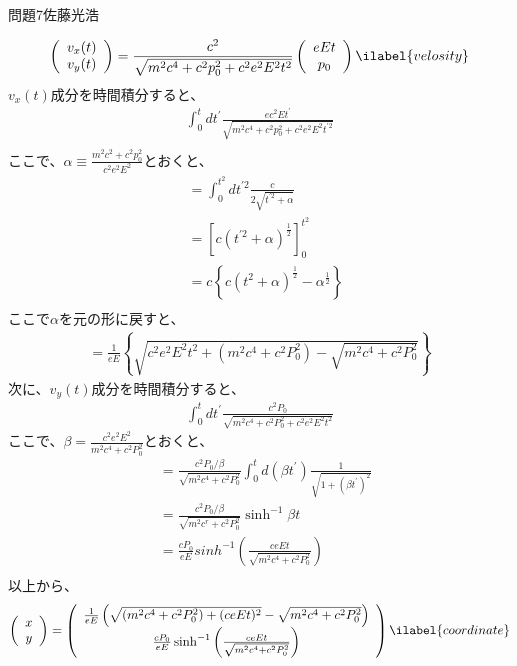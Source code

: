\documentclass[fleqn]{jbook}
\begin{document}
\begin{answer}{問題7}{佐藤光浩}
\begin{enumerate}
\begin{eqnarray}
 \left(\begin{array}{c} 
 v_x(t) \\ v_y(t) \end{array} \right)
 = \frac{c^2}{\sqrt{m^2c^4 + c^2p_0^2 + c^2e^2E^2t^2}}
 \left(\begin{array}{c}
 eEt \\ p_0 \end{array} \right) \ilabel{velosity}
\end{eqnarray}
$v_x(t)$成分を時間積分すると、
\begin{eqnarray*}
 \int^{t}_0 dt^{\prime}
 \frac{ec^2Et^{\prime}}{\sqrt{m^2c^4+c^2p_0^2+c^2e^2E^2t^{\prime 2}}}\\
 \end{eqnarray*}
ここで、$ \alpha \equiv \frac{m^2c^2 +c^2p_0^2}{c^2e^2E^2}$とおくと、
\begin{eqnarray*}
 &= \int^{t^2}_{0}dt^{\prime 2}\frac{c}{2\sqrt{t^{\prime 2} + \alpha}}\\
 &= \left[c(t^{\prime 2} +\alpha)^{\frac{1}{2}}\right]^{t^2}_0\\
 &= c \left\{ c(t^{2} +\alpha)^{\frac{1}{2}} -
 \alpha^{\frac{1}{2}} \right\} \\
\end{eqnarray*}
ここで$\alpha$を元の形に戻すと、
\begin{eqnarray*}
 = \frac{1}{eE} \left\{
 \sqrt{c^2e^2E^2t^2+(m^2c^4+c^2P_0^2)-\sqrt{m^2c^4+c^2P_0^2}}\right\}
\end{eqnarray*}
次に、$v_y(t)$成分を時間積分すると、
\begin{eqnarray*}
 \int^{t}_0 dt^{\prime}
 \frac{c^2P_0}{\sqrt{m^2c^4+c^2P_0^2+c^2e^2E^2t^2}}
\end{eqnarray*}
ここで、$ \beta = \frac{c^2e^2E^2}{m^2c^4+c^2P_0^2}$とおくと、
\begin{eqnarray*}
  &= \frac{c^2P_0/\beta}{\sqrt{m^2c^4+c^2P_0^2}} \int^t_0
  d(\beta t^{\prime}) \frac{1}{\sqrt{1+(\beta t^{\prime})^2}} \\
  &= \frac{c^2P_0/\beta}{\sqrt{m^2c^r+c^2P_0^2}} \sinh^{-1} \beta t \\
  &= \frac{cP_0}{eE} sinh^{-1}
  \left(\frac{ceEt}{\sqrt{m^2c^4+c^2P_0^2}} \right) \\
\end{eqnarray*}
以上から、
\begin{eqnarray}
 \left(\begin{array}{c} x\\ y\end{array} \right) = \left(\begin{array}{c}
 \frac{1}{eE}
 \left(\sqrt{(m^2c^4+c^2P_0^2)+(ceEt)^2}-\sqrt{m^2c^4+c^2P_0^2} \right) \\
  \frac{cP_0}{eE}
 \sinh^{-1}\left(\frac{ceEt}{\sqrt{m^2c^4+c^2P_0^2}}\right) \end{array}
\right) \ilabel{coordinate}
\end{eqnarray}


\end{enumerate}
\end{answer}
\end{document}
